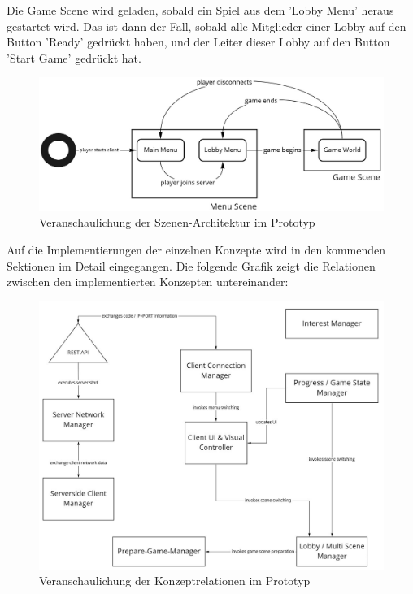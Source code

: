 Die Game Scene wird geladen, sobald ein Spiel aus dem 'Lobby Menu' heraus gestartet wird. Das ist dann der Fall, sobald alle Mitglieder einer Lobby auf den Button 'Ready' gedrückt haben, und der Leiter dieser Lobby auf den Button 'Start Game' gedrückt hat. 

\begin{figure}[H]
	\centering
	\includegraphics[width=150mm]{images/scene_architecture.jpg}
	\caption[Architektur Szenen Diagramm]{Veranschaulichung der Szenen-Architektur im Prototyp}
	\label{pic:scene_architecture}
\end{figure}

Auf die Implementierungen der einzelnen Konzepte wird in den kommenden Sektionen im Detail eingegangen. Die folgende Grafik zeigt die Relationen zwischen den implementierten Konzepten untereinander:

\begin{figure}[H]
	\centering
	\includegraphics[width=150mm]{images/concept_relations.jpg}
	\caption[Architektur Konzept Relationen]{Veranschaulichung der Konzeptrelationen im Prototyp}
	\label{pic:concept_relations}
\end{figure}

